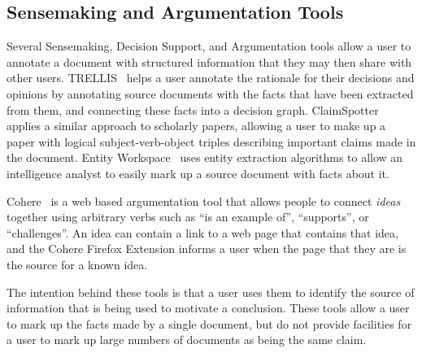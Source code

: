 \documentclass{www2010-submission}
\newcommand{\todo}[1]{}
\begin{document}
\todo{Mention that we could add the +ve and -ve n-grams to the client code? Actually do this?}

\todo{Discuss how and why this is simpler than the server-side classification method}
\todo{Explain how we avoid downloading the entire database}

\todo{Should we have a version where the interface merely suggests n-grams that should be used by the classifier}
\todo{Can we present all these systems without giving detailed stats about how they compare?}
\todo{Add support for a user to enter 'anti-phrases' when a snippet is wrongly highlighted}
\todo{Add support for a user to enter a paraphrase that will match the snippet they are looking at}
\todo{Do a load more people in a final user-study round. Try to get it up to 8.}
\todo{Explain how our algorithm relates to existing NLP work - due to unusual domain}

\subsection{Sensemaking and Argumentation Tools}

\todo{Talk about this work in the introduction?}

Several Sensemaking, Decision Support, and Argumentation tools allow a user to annotate a document with structured information that they may then share with other users. TRELLIS~\cite{Gil2002} helps a user annotate the rationale for their decisions and opinions by annotating source documents with the facts that have been extracted from them, and connecting these facts into a decision graph. ClaimSpotter~\cite{Sereno2005,Sereno2004} applies a similar approach to scholarly papers, allowing a user to make up a paper with logical subject-verb-object triples describing important claims made in the document. Entity Workspace~\cite{Bier2006} uses entity extraction algorithms to allow an intelligence analyst to easily mark up a source document with facts about it.

Cohere~\cite{Shum2008} is a web based argumentation tool that allows people to connect {\it ideas} together using arbitrary verbs such as ``is an example of'', ``supports'', or ``challenges''. An idea can contain a link to a web page that contains that idea, and the Cohere Firefox Extension informs a user when the page that they are is the source for a known idea.

The intention behind these tools is that a user uses them to identify the source of information that is being used to motivate a conclusion. These tools allow a user to mark up the facts made by a single document, but do not provide facilities for a user to mark up large numbers of documents as being the same claim. 
\end{document}
